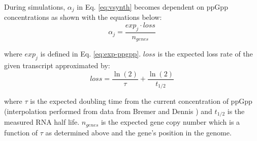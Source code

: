 \documentclass[12pt]{article}
\begin{document}
During simulations, $\alpha_j$ in Eq. \ref{eq:vsynth} becomes dependent on ppGpp concentrations as shown with the equations below:
\begin{equation}
\alpha_j = \frac{exp_j\cdot loss}{n_{genes}}
\end{equation}

\noindent where $exp_j$ is defined in Eq. \ref{eq:exp-ppgpp}. $loss$ is the expected loss rate of the given transcript approximated by:
\begin{equation}
loss = \frac{\ln(2)}{\tau} + \frac{\ln(2)}{t_{1/2}}
\end{equation}

\noindent where $\tau$ is the expected doubling time from the current concentration of ppGpp (interpolation performed from data from Bremer and Dennis \cite{Bremer:1996uj}) and $t_{1/2}$ is the measured RNA half life.  $n_{genes}$ is the expected gene copy number which is a function of $\tau$ as determined above and the gene's position in the genome.

\hspace{1cm}
\end{document}
